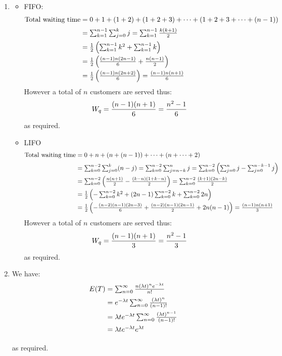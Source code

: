 \documentclass[12pt]{article}
\begin{document}
\begin{enumerate}
\item
    \begin{itemize}
        \item FIFO:
        $$\begin{array}{@{}r@{\;}c@{\;}l@{}}
        \text{Total waiting time}&=&0+1+(1+2)+(1+2+3)+\dots+(1+2+3+\dots+(n-1))\\[2mm]
                                 &=&\sum_{k=1}^{n-1}\sum_{j=0}^kj=\sum_{k=1}^{n-1}{k(k+1)\over2}\\[2mm]
                                 &=&{1\over2}\left(\sum_{k=1}^{n-1}k^2+\sum_{k=1}^{n-1}k\right)\\[2mm]
                                 &=&{1\over2}\left({(n-1)n(2n-1)\over 6}+{n(n-1)\over2}\right)\\[2mm]
                                 &=&{1\over2}\left({(n-1)n(2n+2)\over 6}\right)={(n-1)n(n+1)\over 6}
        \end{array}$$
        However a total of $n$ customers are served thus:
        $$W_q={(n-1)(n+1)\over 6}={n^2-1\over 6}$$ as required.
        \item LIFO
         $$\begin{array}{@{}r@{\;}c@{\;}l@{}}
        \text{Total waiting time}&=&0+n+(n+(n-1))+\dots+(n+\dots+2)\\[2mm]
                                 &=&\sum_{k=0}^{n-2}\sum_{j=0}^k(n-j)=\sum_{k=0}^{n-2}\sum_{j=n-k}^nj=\sum_{k=0}^{n-2}\left(\sum_{j=0}^nj-\sum_{j=0}^{n-k-1}j\right)\\[2mm]
                                 &=&\sum_{k=0}^{n-2}\left({n(n+1)\over2}-{(k-n)(1+k-n)\over2}\right)=\sum_{k=0}^{n-2}{(k+1)(2n-k)\over2}\\[2mm]
                                 &=&{1\over2}\left(-\sum_{k=0}^{n-2}k^2+(2n-1)\sum_{k=0}^{n-2}k+\sum_{k=0}^{n-2}2n\right)\\[2mm]
                                 &=&{1\over2}\left(-{(n-2)(n-1)(2n-3)\over6}+{(n-2)(n-1)(2n-1)\over2}+2n(n-1)\right)={(n-1)n(n+1)\over 3}
        \end{array}$$
        However a total of $n$ customers are served thus:
        $$W_q={(n-1)(n+1)\over 3}={n^2-1\over 3}$$ as required.
    \end{itemize}


\item We have:
$$\begin{array}{@{}r@{\;}c@{\;}l@{}}
E(T)&=&\sum_{n=0}^\infty{n(\lambda t)^ne^{-\lambda t}\over n!}\\[2mm]
    &=&e^{-\lambda t}\sum_{n=0}^\infty{(\lambda t)^n\over (n-1)!}\\[2mm]
    &=&\lambda te^{-\lambda t}\sum_{n=0}^\infty{(\lambda t)^{n-1}\over (n-1)!}\\[2mm]
    &=&\lambda te^{-\lambda t}e^{\lambda t}\\[2mm]
\end{array}$$
  as required.\\


\end{enumerate}
\end{document}
